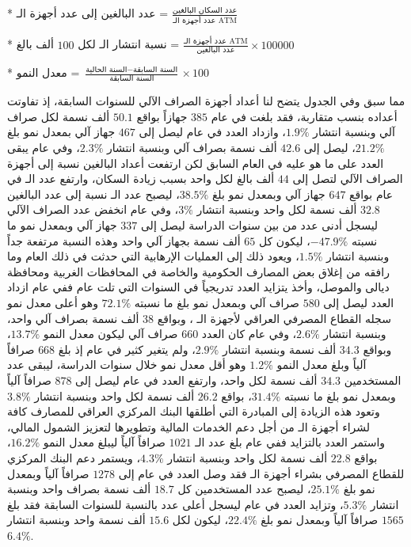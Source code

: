 \documentclass[10pt,a4paper]{report}
\begin{document}
\begin{doublespacing}
* عدد البالغين إلى عدد أجهزة الـ  = \( \frac{\text{عدد السكان البالغين}}{\text{عدد أجهزة الـ ATM}} \)

* نسبة انتشار الـ  لكل \( 100 \) ألف بالغ = \( \frac{\text{عدد أجهزة الـ ATM}}{\text{عدد البالغين}} \times 100000 \)

* معدل النمو = \( \frac{\text{السنة الحالية} - \text{السنة السابقة}}{\text{السنة السابقة}} \times 100 \)

مما سبق وفي الجدول  يتضح لنا أعداد أجهزة الصراف الآلي للسنوات السابقة، إذ تفاوتت أعداده بنسب متقاربة، فقد بلغت في عام  \( 385 \) جهازاً بواقع \( 50.1 \) ألف نسمة لكل صراف آلي وبنسبة انتشار \( 1.9\% \)، وازداد العدد في عام  ليصل إلى \( 467 \) جهاز آلي بمعدل نمو بلغ \( 21.2\% \)، ليصل إلى \( 42.6 \) ألف نسمة بصراف آلي وبنسبة انتشار \( 2.3\% \)، وفي عام  يبقى العدد على ما هو عليه في العام السابق لكن ارتفعت أعداد البالغين نسبة إلى أجهزة الصراف الآلي لتصل إلى \( 44 \) ألف بالغ لكل  واحد بسبب زيادة السكان، وارتفع عدد الـ  في عام  بواقع \( 647 \) جهاز آلي وبمعدل نمو بلغ \( 38.5\% \)، ليصبح عدد الـ  نسبة إلى عدد البالغين \( 32.8 \) ألف نسمة لكل  واحد وبنسبة انتشار \( 3\% \)، وفي عام  انخفض عدد الصراف الآلي ليسجل أدنى عدد من بين سنوات الدراسة ليصل إلى \( 337 \) جهاز آلي وبمعدل نمو ما نسبته \( -47.9\% \)، ليكون كل \( 65 \) ألف نسمة بجهاز آلي واحد وهذه النسبة مرتفعة جداً وبنسبة انتشار \( 1.5\% \)، ويعود ذلك إلى العمليات الإرهابية التي حدثت في ذلك العام وما رافقه من إغلاق بعض المصارف الحكومية والخاصة في المحافظات الغربية ومحافظة ديالى والموصل، وأخذ يتزايد العدد تدريجياً في السنوات التي تلت عام  ففي عام  ازداد العدد ليصل إلى \( 580 \) صراف آلي وبمعدل نمو بلغ ما نسبته \( 72.1\% \) وهو أعلى معدل نمو سجله القطاع المصرفي العراقي لأجهزة الـ ، وبواقع \( 38 \) ألف نسمة بصراف آلي واحد، وبنسبة انتشار \( 2.6\% \)، وفي عام  كان العدد \( 660 \) صراف آلي ليكون معدل النمو \( 13.7\% \)، وبواقع \( 34.3 \) ألف نسمة وبنسبة انتشار \( 2.9\% \)، ولم يتغير كثير في عام  إذ بلغ \( 668 \) صرافاً آلياً وبلغ معدل النمو \( 1.2\% \) وهو أقل معدل نمو خلال سنوات الدراسة، ليبقى عدد المستخدمين \( 34.3 \) ألف نسمة لكل  واحد، وارتفع العدد في عام  ليصل إلى \( 878 \) صرافاً آلياً وبمعدل نمو بلغ ما نسبته \( 31.4\% \)، بواقع \( 26.2 \) ألف نسمة لكل  واحد وبنسبة انتشار \( 3.8\% \) وتعود هذه الزيادة إلى المبادرة التي أطلقها البنك المركزي العراقي للمصارف كافة لشراء أجهزة الـ  من أجل دعم الخدمات المالية وتطويرها لتعزيز الشمول المالي، واستمر العدد بالتزايد ففي عام  بلغ عدد الـ  \( 1021 \) صرافاً آلياً ليبلغ معدل النمو \( 16.2\% \)، بواقع \( 22.8 \) ألف نسمة لكل  واحد وبنسبة انتشار \( 4.3\% \)، ويستمر دعم البنك المركزي للقطاع المصرفي بشراء أجهزة الـ  فقد وصل العدد في عام  إلى \( 1278 \) صرافاً آلياً وبمعدل نمو بلغ \( 25.1\% \)، ليصبح عدد المستخدمين كل \( 18.7 \) ألف نسمة بصراف واحد وبنسبة انتشار \( 5.3\% \)، وتزايد العدد في عام  ليسجل أعلى عدد بالنسبة للسنوات السابقة فقد بلغ \( 1565 \) صرافاً آلياً وبمعدل نمو بلغ \( 22.4\% \)، ليكون لكل \( 15.6 \) ألف نسمة  واحد وبنسبة انتشار \( 6.4\% \).


\end{doublespacing}
\end{document}
